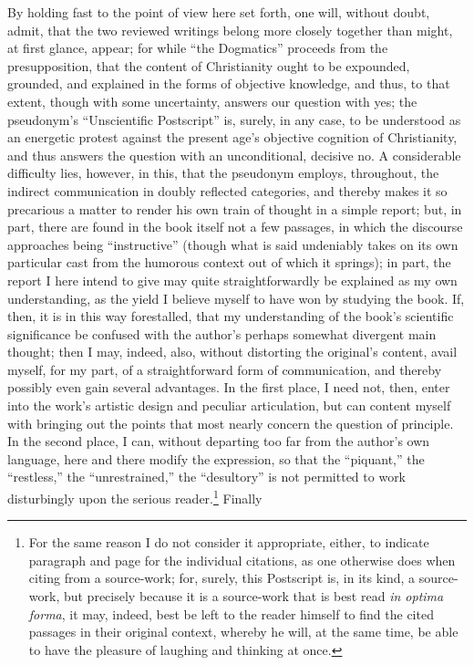 \documentclass[12pt]{book}
\begin{document}
By holding fast to the point of view here set forth, one will, without doubt, admit, that the two reviewed writings belong more closely together than might, at first glance, appear; for while ``the Dogmatics'' proceeds from the presupposition, that the content of Christianity ought to be expounded, grounded, and explained in the forms of objective knowledge, and thus, to that extent, though with some uncertainty, answers our question with yes; the pseudonym's ``Unscientific Postscript'' is, surely, in any case, to be understood as an energetic protest against the present age's objective cognition of Christianity, and thus answers the question with an unconditional, decisive no.
A considerable difficulty lies, however, in this, that the pseudonym employs, throughout, the indirect communication in doubly reflected categories, and thereby makes it so precarious a matter to render his own train of thought in a simple report; but, in part, there are found in the book itself not a few passages, in which the discourse approaches being ``instructive'' (though what is said undeniably takes on its own particular cast from the humorous context out of which it springs); in part, the report I here intend to give may quite straightforwardly be explained as my own understanding, as the yield I believe myself to have won by studying the book. If, then, it is in this way forestalled, that my understanding of the book's scientific significance be confused with the author's perhaps somewhat divergent main thought; then I may, indeed, also, without distorting the original's content, avail myself, for my part, of a straightforward form of communication, and thereby possibly even gain several advantages. In the first place, I need not, then, enter into the work's artistic design and peculiar articulation, but can content myself with bringing out the points that most nearly concern the question of principle. In the second place, I can, without departing too far from the author's own language, here and there modify the expression, so that the ``piquant,'' the ``restless,'' the ``unrestrained,'' the ``desultory'' is not permitted to work disturbingly upon the serious reader.\footnote{For the same reason I do not consider it appropriate, either, to indicate paragraph and page for the individual citations, as one otherwise does when citing from a source-work; for, surely, this Postscript is, in its kind, a source-work, but precisely because it is a source-work that is best read \textit{in optima forma}, it may, indeed, best be left to the reader himself to find the cited passages in their original context,
whereby he will, at the same time, be able to have the pleasure of laughing and thinking at once.} Finally
\end{document}
